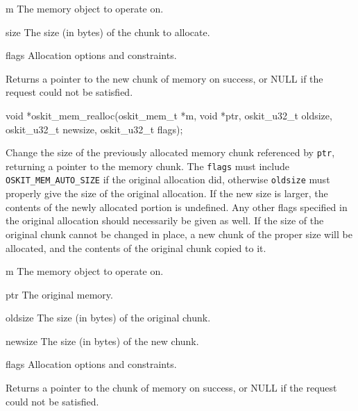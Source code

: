 \begin{apiparm}
	\item[m]
		The memory object to operate on.
	\item[size]
		The size (in bytes) of the chunk to allocate.
	\item[flags]
		Allocation options and constraints.
\end{apiparm}
\begin{apiret}
	Returns a pointer to the new chunk of memory on success, or NULL if
	the request could not be satisfied.
\end{apiret}


\begin{apisyn}

	\funcproto void *oskit_mem_realloc(oskit_mem_t *m,
				void *ptr,
				oskit_u32_t oldsize, oskit_u32_t newsize,
				oskit_u32_t flags);
\end{apisyn}
\begin{apidesc}
	Change the size of the previously allocated memory chunk referenced
	by \texttt{ptr}, returning a pointer to the memory chunk. The
	\texttt{flags} must include \texttt{OSKIT_MEM_AUTO_SIZE} if the
	original allocation did, otherwise \texttt{oldsize} must properly
	give the size of the original allocation. If the new size is
	larger, the contents of the newly allocated portion is
	undefined. Any other flags specified in the original allocation
	should necessarily be given as well. If the size of the original
	chunk cannot be changed in place, a new chunk of the proper size
	will be allocated, and the contents of the original chunk copied to
	it.
\end{apidesc}
\begin{apiparm}
	\item[m]
		The memory object to operate on.
	\item[ptr]
		The original memory.
	\item[oldsize]
		The size (in bytes) of the original chunk.
	\item[newsize]
		The size (in bytes) of the new chunk.
	\item[flags]
		Allocation options and constraints.
\end{apiparm}
\begin{apiret}
	Returns a pointer to the chunk of memory on success, or NULL if
	the request could not be satisfied.
\end{apiret}


